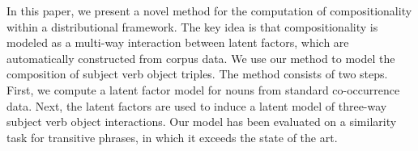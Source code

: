 In this paper, we present a novel method for the computation of compositionality within a distributional framework. The key idea is that
 compositionality is modeled as a multi-way interaction between latent factors,
 which are automatically constructed from corpus data. We use our method to
 model the composition of subject verb object triples. The method consists of
 two steps. First, we compute a latent factor model for nouns from standard
 co-occurrence data. Next, the latent factors are used to induce a latent model
 of three-way subject verb object interactions. Our model has been evaluated on
 a similarity task for transitive phrases, in which it exceeds the state of the
 art.

